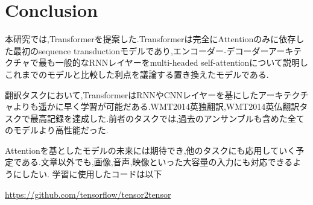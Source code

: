\documentclass{jarticle}     %
\begin{document}
\section{Conclusion}
本研究では,Transformerを提案した.Transformerは完全にAttentionのみに依存した最初のsequence transductionモデルであり,エンコーダー-デコーダーアーキテクチャで最も一般的なRNNレイヤーをmulti-headed self-attentionについて説明しこれまでのモデルと比較した利点を議論する置き換えたモデルである.\par
翻訳タスクにおいて,TransformerはRNNやCNNレイヤーを基にしたアーキテクチャよりも遥かに早く学習が可能だある.WMT2014英独翻訳,WMT2014英仏翻訳タスクで最高記録を達成した.前者のタスクでは,過去のアンサンブルも含めた全てのモデルより高性能だった.\par
Attentionを基としたモデルの未来には期待でき,他のタスクにも応用していく予定である.文章以外でも,画像,音声,映像といった大容量の入力にも対応できるようにしたい.
学習に使用したコードは以下\par
\url{https://github.com/tensorflow/tensor2tensor}




\end{document}
